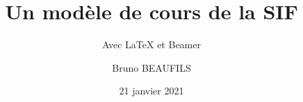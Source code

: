 \title[SIF]{Un modèle de cours de la SIF}
\subtitle{Avec \LaTeX{} et Beamer}
\author{Bruno BEAUFILS}
\date{21 janvier 2021}
